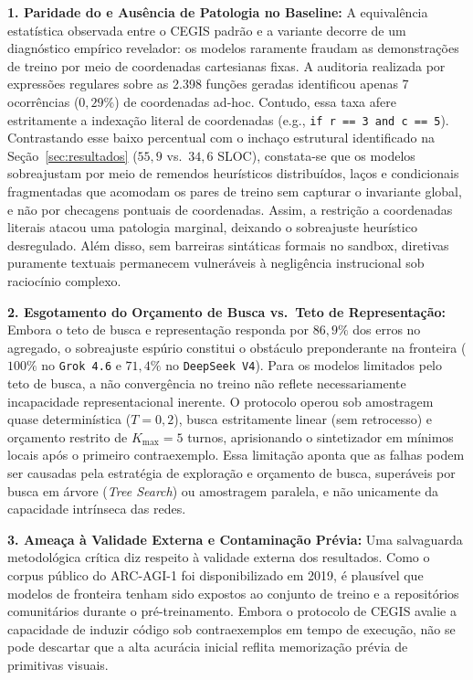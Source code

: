 \documentclass[letterpaper]{article} %
\begin{document}
\noindent\textbf{1. Paridade do \AntiTrapaca{} e Aus{\^e}ncia de Patologia no Baseline:}
A equival{\^{e}}ncia estat{\'{i}}stica observada entre o CEGIS padr{\~a}o e a variante \AntiTrapaca{} decorre de um diagn{\'o}stico emp{\'{i}}rico revelador: os modelos raramente fraudam as demonstra{\c{c}}{\~o}es de treino por meio de coordenadas cartesianas fixas. A auditoria realizada por express{\~o}es regulares sobre as 2.398 fun{\c{c}}{\~o}es geradas identificou apenas 7 ocorr{\^{e}}ncias ($0{,}29\%$) de coordenadas ad-hoc. Contudo, essa taxa afere estritamente a indexa{\c{c}}{\~a}o literal de coordenadas (e.g., \texttt{if r == 3 and c == 5}). Contrastando esse baixo percentual com o incha{\c{c}}o estrutural identificado na Se{\c{c}}{\~a}o~\ref{sec:resultados} ($55{,}9$ vs.\ $34{,}6$ SLOC), constata-se que os modelos sobreajustam por meio de remendos heur{\'{i}}sticos distribu{\'{i}}dos, la{\c{c}}os e condicionais fragmentadas que acomodam os pares de treino sem capturar o invariante global, e n{\~a}o por checagens pontuais de coordenadas. Assim, a restri{\c{c}}{\~a}o a coordenadas literais atacou uma patologia marginal, deixando o sobreajuste heur{\'{i}}stico desregulado. Al{\'{e}}m disso, sem barreiras sint{\'{a}}ticas formais no sandbox, diretivas puramente textuais permanecem vulner{\'{a}}veis {\`{a}} neglig{\^e}ncia instrucional sob racioc{\'{i}}nio complexo.

\noindent\textbf{2. Esgotamento do Or{\c{c}}amento de Busca vs.\ Teto de Representa{\c{c}}{\~a}o:}
Embora o teto de busca e representa{\c{c}}{\~a}o responda por $86{,}9\%$ dos erros no agregado, o sobreajuste esp{\'{u}}rio constitui o obst{\'{a}}culo preponderante na fronteira ($100\%$ no \texttt{Grok 4.6} e $71{,}4\%$ no \texttt{DeepSeek V4}). Para os modelos limitados pelo teto de busca, a n{\~a}o converg{\^{e}}ncia no treino n{\~a}o reflete necessariamente incapacidade representacional inerente. O protocolo operou sob amostragem quase determin{\'{i}}stica ($T=0{,}2$), busca estritamente linear (sem retrocesso) e or{\c{c}}amento restrito de $K_{\max}=5$ turnos, aprisionando o sintetizador em m{\'{i}}nimos locais ap{\'{o}}s o primeiro contraexemplo. Essa limita{\c{c}}{\~a}o aponta que as falhas podem ser causadas pela estrat{\'{e}}gia de explora{\c{c}}{\~a}o e or{\c{c}}amento de busca, super{\'{a}}veis por busca em {\'{a}}rvore (\textit{Tree Search}) ou amostragem paralela, e n{\~a}o unicamente da capacidade intr{\'{i}}nseca das redes.

\noindent\textbf{3. Amea{\c{c}}a {\`{a}} Validade Externa e Contamina{\c{c}}{\~a}o Pr{\'{e}}via:}
Uma salvaguarda metodol{\'{o}}gica cr{\'{i}}tica diz respeito {\`{a}} validade externa dos resultados. Como o corpus p{\'{u}}blico do ARC-AGI-1 foi disponibilizado em 2019, {\'{e}} plaus{\'{i}}vel que modelos de fronteira tenham sido expostos ao conjunto de treino e a reposit{\'{o}}rios comunit{\'{a}}rios durante o pr{\'{e}}-treinamento. Embora o protocolo de CEGIS avalie a capacidade de induzir c{\'{o}}digo sob contraexemplos em tempo de execu{\c{c}}{\~a}o, n{\~a}o se pode descartar que a alta acur{\'{a}}cia inicial reflita memoriza{\c{c}}{\~a}o pr{\'{e}}via de primitivas visuais.
\end{document}
